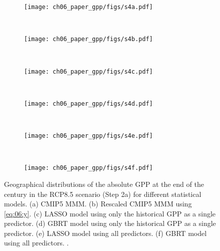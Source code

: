 \begin{figure}[p]
  \centering
  \begin{subfigure}[b]{\SubfigureWidth{}}
    \texttt{[image: ch06\_paper\_gpp/figs/s4a.pdf]}
    \caption{}
    \label{fig:app:b:step2a_results:a}
  \end{subfigure}
  ~
  \begin{subfigure}[b]{\SubfigureWidth{}}
    \texttt{[image: ch06\_paper\_gpp/figs/s4b.pdf]}
    \caption{}
    \label{fig:app:b:step2a_results:b}
  \end{subfigure}
  \\
    \begin{subfigure}[b]{\SubfigureWidth{}}
    \texttt{[image: ch06\_paper\_gpp/figs/s4c.pdf]}
    \caption{}
    \label{fig:app:b:step2a_results:c}
  \end{subfigure}
  ~
  \begin{subfigure}[b]{\SubfigureWidth{}}
    \texttt{[image: ch06\_paper\_gpp/figs/s4d.pdf]}
    \caption{}
    \label{fig:app:b:step2a_results:d}
  \end{subfigure}
  \\
    \begin{subfigure}[b]{\SubfigureWidth{}}
    \texttt{[image: ch06\_paper\_gpp/figs/s4e.pdf]}
    \caption{}
    \label{fig:app:b:step2a_results:e}
  \end{subfigure}
  ~
  \begin{subfigure}[b]{\SubfigureWidth{}}
    \texttt{[image: ch06\_paper\_gpp/figs/s4f.pdf]}
    \caption{}
    \label{fig:app:b:step2a_results:f}
  \end{subfigure}
  \caption[
    Geographical distributions of the absolute \acf{GPP} at the end of the
     century in the \acs{RCP}8.5 scenario (Step 2a) for different
    statistical models.
  ]{
    Geographical distributions of the absolute \acf{GPP} at the end of the
     century in the \acs{RCP}8.5 scenario (Step 2a) for different
    statistical models. (a) \acs{CMIP}5 \acf{MMM}. (b) Rescaled \acs{CMIP}5
    \acs{MMM} using \cref{eq:06:y}. (c) \Acf{LASSO} model using only the
    historical \acs{GPP} as a single predictor. (d) \Acf{GBRT} model using only
    the historical \acs{GPP} as a single predictor. (e) \acs{LASSO} model using
    all predictors. (f) \acs{GBRT} model using all predictors.
    .
  }
  \label{fig:app:b:step2a_results}
\end{figure}

